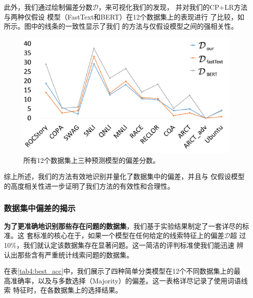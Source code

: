 此外，我们通过绘制偏差分数$\mathcal{D}$，来可视化我们的发现，
并对我们的CP+LR方法与两种仅假设
模型（FastText和BERT）在12个数据集上的表现进行
了比较，如所示。图中的线条的一致性显示了我们
的方法与仅假设模型之间的强相关性。

\begin{figure}[th]
    \centering
    \includegraphics[width=0.65\columnwidth]{figures/iconip/d_figure.pdf}
    \caption{所有12个数据集上三种预测模型的偏差分数。}
    \label{fig4:d_figure}
    \end{figure}
综上所述，我们的方法有效地识别并量化了数据集中的偏差，并且与
仅假设模型的高度相关性进一步证明了我们方法的有效性和合理性。

\subsubsection*{数据集中偏差的揭示}
\textbf{为了更准确地识别那些存在问题的数据集}，我们基于实验结果制定了一套详尽的标准。这
套标准的核心在于，如果一个模型在任何给定的线索特征上的偏差$\mathcal{D}$超
过10\%，我们就认定该数据集存在显著问题。这一简洁的评判标准使我们能迅速
辨认出那些含有严重统计线索问题的数据集。

在表\ref{tab4:best_acc}中，我们展示了四种简单分类模型在12个不同数据集上的最
高准确率，以及与多数选择（Majority）的偏差。这一表格详尽记录了使用词语线索
特征时，在各数据集上的选择结果。



